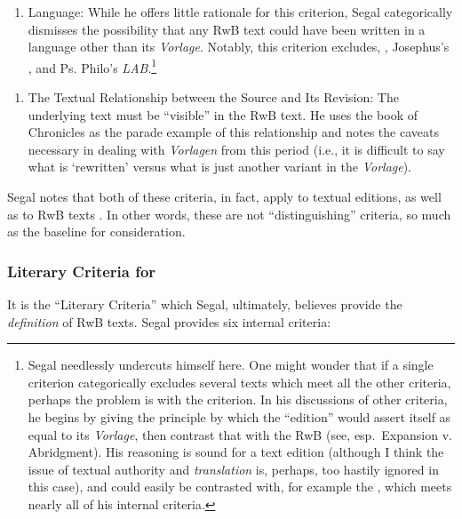 \begin{enumerate} \def\labelenumi{\arabic{enumi}.} \tightlist \item   Language: While he offers little rationale for this criterion, Segal   categorically dismisses the possibility that any RwB text could have   been written in a language other than its \emph{Vorlage}. Notably,   this criterion excludes, \ga, Josephus's   \ant, and Ps. Philo's \emph{LAB}.\footnote{Segal     needlessly undercuts himself here. One might wonder that if a single     criterion categorically excludes several texts which meet all the     other criteria, perhaps the problem is with the criterion. In his     discussions of other criteria, he begins by giving the principle by     which the ``edition'' would assert itself as equal to its     \emph{Vorlage}, then contrast that with the RwB (see, esp.~Expansion     v. Abridgment). His reasoning is sound for a text edition (although     I think the issue of textual authority and \emph{translation} is,     perhaps, too hastily ignored in this case), and could easily be     contrasted with, for example the \ga, which meets     nearly all of his internal criteria.} \end{enumerate} 

 \begin{enumerate} \def\labelenumi{\arabic{enumi}.} \setcounter{enumi}{1} \tightlist \item   The Textual Relationship between the Source and Its Revision: The   underlying text must be ``visible'' in the RwB text. He uses the book   of Chronicles as the parade example of this relationship and notes the   caveats necessary in dealing with \emph{Vorlagen} from this period   (i.e., it is difficult to say what is `rewritten' versus what is just   another variant in the \emph{Vorlage}). \end{enumerate} 

 Segal notes that both of these criteria, in fact, apply to textual editions, as well as to RwB texts \autocite[20]{segal_henze2005}. In other words, these are not ``distinguishing'' criteria, so much as the baseline for consideration. 

 \hypertarget{literary-criteria-for-rwb}{%
\subsubsection{Literary Criteria for \RWB}\label{literary-criteria-for-rwb}} 

 It is the ``Literary Criteria'' which Segal, ultimately, believes provide the \emph{definition} of RwB texts.\autocite[20]{segal_henze2005} Segal provides six internal criteria: 


